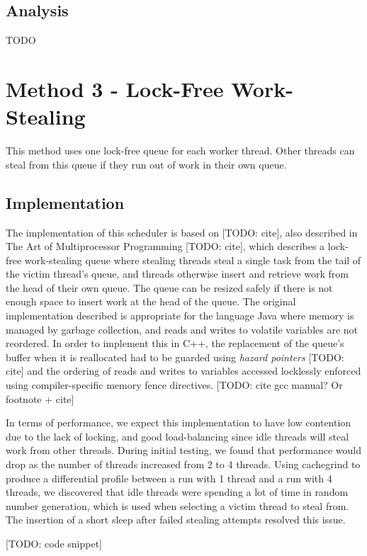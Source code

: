\documentclass[12pt,twoside,abbrevs,msc,ai,notimes,logo,sansheadings]{infthesis}
\begin{document}
  \section{Analysis}
  TODO
  
  \chapter {Method 3 - Lock-Free Work-Stealing}
  
  This method uses one lock-free queue for each worker thread. Other threads can steal from this queue if they run out of work in their own queue.
  
  \section {Implementation}
  
  The implementation of this scheduler is based on [TODO: cite], also described in The Art of Multiprocessor Programming [TODO: cite], which describes a lock-free work-stealing queue where stealing threads steal a single task from the tail of the victim thread's queue, and threads otherwise insert and retrieve work from the head of their own queue. The queue can be resized safely if there is not enough space to insert work at the head of the queue. The original implementation described is appropriate for the language Java where memory is managed by garbage collection, and reads and writes to volatile variables are not reordered. In order to implement this in C++, the replacement of the queue's buffer when it is reallocated had to be guarded using \emph{hazard pointers} [TODO: cite] and the ordering of reads and writes to variables accessed locklessly enforced using compiler-specific memory fence directives. [TODO: cite gcc manual? Or footnote + cite]
  
  In terms of performance, we expect this implementation to have low contention due to the lack of locking, and good load-balancing since idle threads will steal work from other threads. During initial testing, we found that performance would drop as the number of threads increased from 2 to 4 threads. Using cachegrind to produce a differential profile between a run with 1 thread and a run with 4 threads, we discovered that idle threads were spending a lot of time in random number generation, which is used when selecting a victim thread to steal from. The insertion of a short sleep after failed stealing attempts resolved this issue.
   
  [TODO: code snippet]
  
\end{document}
